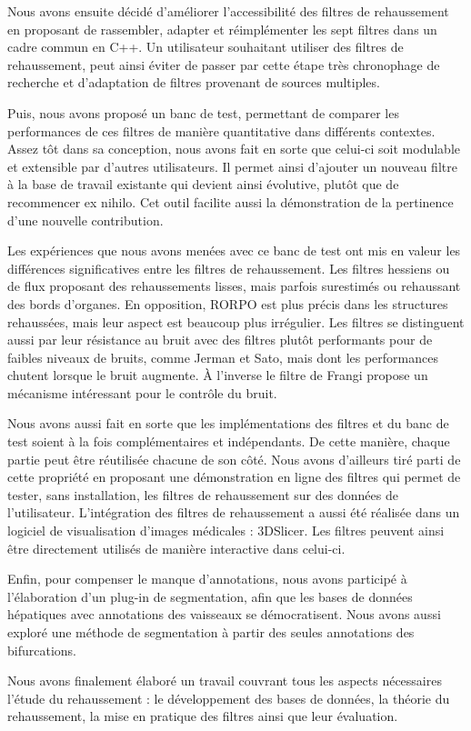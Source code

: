 Nous avons ensuite décidé d'améliorer l'accessibilité des filtres de rehaussement en proposant de rassembler, adapter et réimplémenter les sept filtres dans un cadre commun en C++. Un utilisateur souhaitant utiliser des filtres de rehaussement, peut ainsi éviter de passer par cette étape très chronophage de recherche et d'adaptation de filtres provenant de sources multiples. 

Puis, nous avons proposé un banc de test, permettant de comparer les performances de ces filtres de manière quantitative dans différents contextes. Assez tôt dans sa conception, nous avons fait en sorte que celui-ci soit modulable et extensible par d'autres utilisateurs. Il permet ainsi d'ajouter un nouveau filtre à la base de travail existante qui devient ainsi évolutive, plutôt que de recommencer ex nihilo. Cet outil facilite aussi la démonstration de la pertinence d'une nouvelle contribution.

Les expériences que nous avons menées avec ce banc de test ont mis en valeur les différences significatives entre les filtres de rehaussement. Les filtres hessiens ou de flux proposant des rehaussements lisses, mais parfois surestimés ou rehaussant des bords d'organes. En opposition, RORPO est plus précis dans les structures rehaussées, mais leur aspect est beaucoup plus irrégulier. Les filtres se distinguent aussi par leur résistance au bruit avec des filtres plutôt performants pour de faibles niveaux de bruits, comme Jerman et Sato, mais dont les performances chutent lorsque le bruit augmente. À l'inverse le filtre de Frangi propose un mécanisme intéressant pour le contrôle du bruit.

Nous avons aussi fait en sorte que les implémentations des filtres et du banc de test soient à la fois complémentaires et indépendants. De cette manière, chaque partie peut être réutilisée chacune de son côté. Nous avons d'ailleurs tiré parti de cette propriété en proposant une démonstration en ligne des filtres qui permet de tester, sans installation, les filtres de rehaussement sur des données de l'utilisateur. L'intégration des filtres de rehaussement a aussi été réalisée dans un logiciel de visualisation d'images médicales : 3DSlicer. Les filtres peuvent ainsi être directement utilisés de manière interactive dans celui-ci.

Enfin, pour compenser le manque d'annotations, nous avons participé à l'élaboration d'un plug-in de segmentation, afin que les bases de données hépatiques avec annotations des vaisseaux se démocratisent. Nous avons aussi exploré une méthode de segmentation à partir des seules annotations des bifurcations.

Nous avons finalement élaboré un travail couvrant tous les aspects nécessaires l'étude du rehaussement : le développement des bases de données, la théorie du rehaussement, la mise en pratique des filtres ainsi que leur évaluation.
